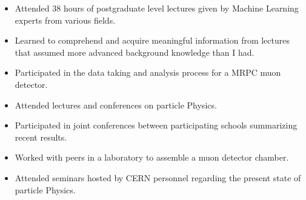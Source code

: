 \documentclass{res}[12pt] %
\begin{document}
\begin{resume}

\begin{itemize}
\item Attended 38 hours of postgraduate level lectures given by Machine Learning experts from various fields.
\item Learned to comprehend and acquire meaningful information from lectures that assumed more advanced background knowledge than I had.
\end{itemize}

\begin{itemize}
\item Participated in the data taking and analysis process for a MRPC muon detector.
\item Attended lectures and conferences on particle Physics.
\item Participated in joint conferences between participating schools summarizing recent results.
\end{itemize}

\begin{itemize}
\item Worked with peers in a laboratory to assemble a muon detector chamber.
\item Attended seminars hosted by CERN personnel regarding the present state of particle Physics.
\end{itemize}

 



\end{resume}
\end{document}

